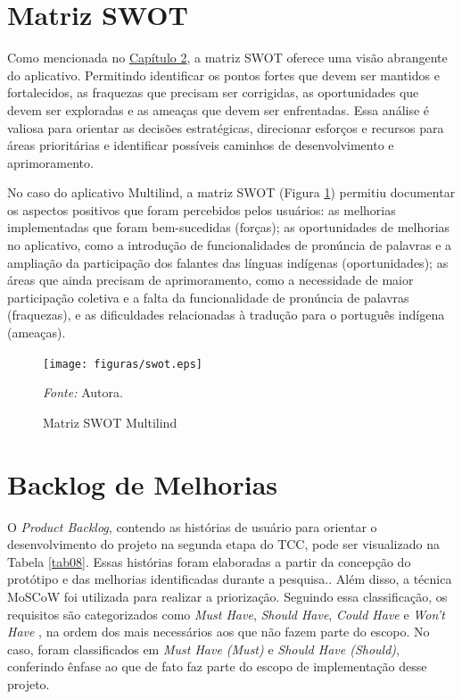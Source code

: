 \section{Matriz SWOT}
\label{sec:Matriz SWOT}

Como mencionada no \hyperref[chap:Referencial]{Capítulo 2}, a matriz SWOT oferece uma visão abrangente do aplicativo. Permitindo identificar os pontos fortes que devem ser mantidos e fortalecidos, as fraquezas que precisam ser corrigidas, as oportunidades que devem ser exploradas 
e as ameaças que devem ser enfrentadas. Essa análise é valiosa para orientar as decisões estratégicas, direcionar esforços e recursos para áreas prioritárias e identificar possíveis caminhos de desenvolvimento e aprimoramento.

No caso do aplicativo Multilind, a matriz SWOT (Figura \ref{fig30}) permitiu documentar os aspectos positivos que foram percebidos pelos usuários: as melhorias implementadas que foram bem-sucedidas (forças); as oportunidades de melhorias no aplicativo, como a introdução de funcionalidades de 
pronúncia de palavras e a ampliação da participação dos falantes das línguas indígenas (oportunidades); as áreas que ainda precisam de aprimoramento, como a necessidade de maior participação coletiva e a falta da funcionalidade de pronúncia de palavras (fraquezas), e as dificuldades 
relacionadas à tradução para o português indígena (ameaças).

\begin{figure}[h!]
	\centering
	\caption{Matriz SWOT Multilind}
	\begin{adjustbox}{center}
		\texttt{[image: figuras/swot.eps]}
	\end{adjustbox}
	\begin{tablenotes}[flushleft]
		\centering
		\item \textit{Fonte:} Autora.
	\end{tablenotes}
	\label{fig30}
\end{figure}



\section{Backlog de Melhorias}
\label{sec:Backlog de Melhorias}
O \textit{Product Backlog}, contendo as histórias de usuário para orientar o desenvolvimento do projeto na segunda etapa do TCC, pode ser visualizado na Tabela \ref{tab08}. Essas histórias foram elaboradas a 
partir da concepção do protótipo e das melhorias identificadas durante a pesquisa.. Além disso, a técnica MoSCoW foi utilizada para realizar a priorização. Seguindo essa classificação, os requisitos são 
categorizados como \textit{Must Have}, \textit{Should Have}, \textit{Could Have} e \textit{Won't Have} \cite{miranda2021}, na ordem dos mais necessários aos que não fazem parte do escopo. No caso, foram 
classificados em \textit{Must Have (Must)} e \textit{Should Have (Should)}, conferindo ênfase ao que de fato faz parte do escopo de implementação desse projeto.

